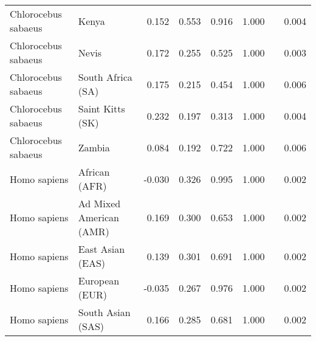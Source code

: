 \begin{center}
\begin{adjustbox}{width = 1\textwidth}
\begin{tabular}{|l|l|r|r|r|r|r|}
 Chlorocebus sabaeus &                           Kenya &                 0.152 &                                0.553 &                0.916 &                                  1.000~~ &              0.004 \\
 Chlorocebus sabaeus &                           Nevis &                 0.172 &                                0.255 &                0.525 &                                  1.000~~ &              0.003 \\
 Chlorocebus sabaeus &               South Africa (SA) &                 0.175 &                                0.215 &                0.454 &                                  1.000~~ &              0.006 \\
 Chlorocebus sabaeus &                Saint Kitts (SK) &                 0.232 &                                0.197 &                0.313 &                                  1.000~~ &              0.004 \\
 Chlorocebus sabaeus &                          Zambia &                 0.084 &                                0.192 &                0.722 &                                  1.000~~ &              0.006 \\
        Homo sapiens &                   African (AFR) &                -0.030 &                                0.326 &                0.995 &                                  1.000~~ &              0.002 \\
        Homo sapiens &         Ad Mixed American (AMR) &                 0.169 &                                0.300 &                0.653 &                                  1.000~~ &              0.002 \\
        Homo sapiens &                East Asian (EAS) &                 0.139 &                                0.301 &                0.691 &                                  1.000~~ &              0.002 \\
        Homo sapiens &                  European (EUR) &                -0.035 &                                0.267 &                0.976 &                                  1.000~~ &              0.002 \\
        Homo sapiens &               South Asian (SAS) &                 0.166 &                                0.285 &                0.681 &                                  1.000~~ &              0.002 \\
\bottomrule
\end{tabular}
\end{adjustbox}
\end{center}
\newpage
